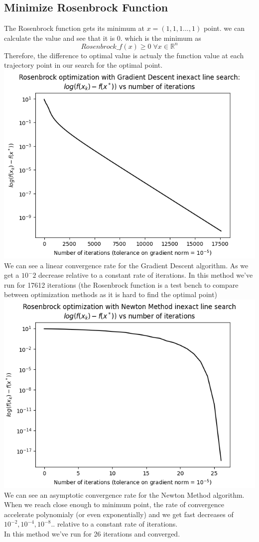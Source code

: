 \documentclass[12pt]{article}
\begin{document}
\subsection{Minimize  Rosenbrock  Function}
The Rosenbrock function gets its minimum at $x = (1,1,1...,1)$ point. we can calculate the value and see that it is 0. which is the minimum as $$Rosenbrock\_f(x) \geq 0\; \forall x \in \mathbb{R}^n$$
Therefore, the difference to optimal value is actualy the function value at each trajectory point in our search for the optimal point.\\
\includegraphics[scale=0.5]{r_f_gd.png}\\
We can see a linear convergence rate for the Gradient Descent algorithm. As we get a $10^-2$ decrease relative to a constant rate of iterations.
In this method we've run for 17612 iterations (the Rosenbrock function is a test bench to compare between optimization methods as it is hard to find the optimal point)\\
\newpage
\includegraphics[scale=0.5]{r_f_nm.png}\\
We can see an asymptotic convergence rate for the Newton Method algorithm. When we reach close enough to minimum point, the rate of convergence accelerate polynomialy (or even exponentially) and we get fast decreases of $10^{-2},10^{-4},10^{-8}..$ relative to a constant rate of iterations.\\
In this method we've run for 26 iterations and converged.
\end{document}
